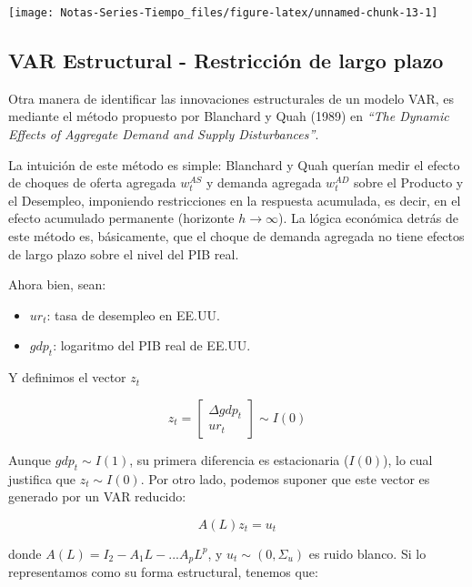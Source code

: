 \documentclass[
]{book}
\providecommand{\tightlist}{%
  \setlength{\itemsep}{0pt}\setlength{\parskip}{0pt}}
\begin{document}
\begin{center}\texttt{[image: Notas-Series-Tiempo\_files/figure-latex/unnamed-chunk-13-1]} \end{center}

\hypertarget{var-estructural---restricciuxf3n-de-largo-plazo}{%
\subsection{VAR Estructural - Restricción de largo plazo}\label{var-estructural---restricciuxf3n-de-largo-plazo}}

Otra manera de identificar las innovaciones estructurales de un modelo VAR, es mediante el método propuesto por Blanchard y Quah (1989) en \emph{``The Dynamic Effects of Aggregate Demand and Supply Disturbances''}.

La intuición de este método es simple: Blanchard y Quah querían medir el efecto de choques de oferta agregada \(w_t^{AS}\) y demanda agregada \(w_t^{AD}\) sobre el Producto y el Desempleo, imponiendo restricciones en la respuesta acumulada, es decir, en el efecto acumulado permanente (horizonte \(h \rightarrow \infty\)). La lógica económica detrás de este método es, básicamente, que el choque de demanda agregada no tiene efectos de largo plazo sobre el nivel del PIB real.

Ahora bien, sean:

\begin{itemize}
\tightlist
\item
  \(ur_t\): tasa de desempleo en EE.UU.
\item
  \(gdp_t\): logaritmo del PIB real de EE.UU.
\end{itemize}

Y definimos el vector \(z_t\)

\begin{equation}
z_t = \begin{bmatrix} \Delta gdp_t \\ ur_t \end{bmatrix} \sim I(0)
\end{equation}

Aunque \(gdp_t \sim I(1)\), su primera diferencia es estacionaria (\(I(0)\)), lo cual justifica que \(z_t \sim I(0)\). Por otro lado, podemos suponer que este vector es generado por un VAR reducido:

\begin{equation}
A(L) z_t = u_t
\end{equation}

donde \(A(L)=I_2-A_1L-...A_pL^p\), y \(u_t \sim (0, \Sigma_u)\) es ruido blanco. Si lo representamos como su forma estructural, tenemos que:
\end{document}
